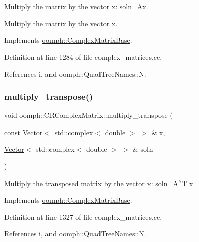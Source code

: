 Multiply the matrix by the vector x\+: soln=Ax. 

Multiply the matrix by the vector x. 

Implements \hyperlink{classoomph_1_1ComplexMatrixBase_a730c106643464a29ebf0660a6921ebaa}{oomph\+::\+Complex\+Matrix\+Base}.



Definition at line 1284 of file complex\+\_\+matrices.\+cc.



References i, and oomph\+::\+Quad\+Tree\+Names\+::N.

\mbox{\label{classoomph_1_1CRComplexMatrix_a5df8a8b3bb15ce5627e7300448b13d28}} 
\subsubsection{\texorpdfstring{multiply\+\_\+transpose()}{multiply\_transpose()}}
{\footnotesize\ttfamily void oomph\+::\+C\+R\+Complex\+Matrix\+::multiply\+\_\+transpose (\begin{DoxyParamCaption}\item[{const \hyperlink{classoomph_1_1Vector}{Vector}$<$ std\+::complex$<$ double $>$ $>$ \&}]{x,  }\item[{\hyperlink{classoomph_1_1Vector}{Vector}$<$ std\+::complex$<$ double $>$ $>$ \&}]{soln }\end{DoxyParamCaption})\hspace{0.3cm}{\ttfamily [virtual]}}



Multiply the transposed matrix by the vector x\+: soln=A$^\wedge$T x. 



Implements \hyperlink{classoomph_1_1ComplexMatrixBase_a90c7832bad84aad3d0f437925efb089a}{oomph\+::\+Complex\+Matrix\+Base}.



Definition at line 1327 of file complex\+\_\+matrices.\+cc.



References i, and oomph\+::\+Quad\+Tree\+Names\+::N.

\mbox{\label{classoomph_1_1CRComplexMatrix_a4151bc429f2da548cee234e147003bfa}} 
